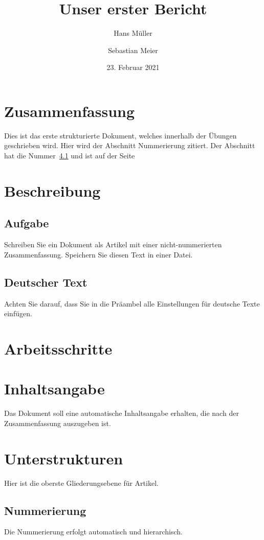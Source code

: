\documentclass[a4paper, 12pt]{article} %
\begin{document}

\title{Unser erster Bericht}
\author{Hans Müller \and Sebastian Meier}
\date{23. Februar 2021}
\maketitle
\section*{Zusammenfassung}

Dies ist das erste strukturierte Dokument, welches innerhalb der Übungen
geschrieben wird. Hier wird der Abschnitt \dq Nummerierung\dq{} zitiert.
Der Abschnitt hat die Nummer~\ref{nummerierung} und ist 
auf der Seite~\pageref{nummerierung}
\tableofcontents
\listoftables
\listoffigures

\section{Beschreibung}
\subsection{Aufgabe}\label{aufgabe}
Schreiben Sie ein Dokument als Artikel mit einer nicht-nummerierten
Zusammenfassung. Speichern Sie diesen Text in einer Datei.

\subsection{Deutscher Text}
Achten Sie darauf, dass Sie in die Präambel alle Einstellungen für 
deutsche Texte einfügen.

\section{Arbeitsschritte}

\section{Inhaltsangabe}
Das Dokument soll eine automatische Inhaltsangabe erhalten, die nach der 
Zusammenfassung auszugeben ist.

\section{Unterstrukturen}
Hier ist die oberste Gliederungsebene für Artikel.

\subsection{Nummerierung}\label{nummerierung}
Die Nummerierung erfolgt automatisch und hierarchisch.
\end{document}
